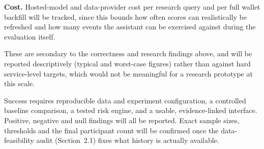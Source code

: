 \textbf{Cost.} Hosted-model and data-provider cost per research query and per full wallet backfill will be tracked, since this bounds how often scores can realistically be refreshed and how many events the assistant can be exercised against during the evaluation itself.

These are secondary to the correctness and research findings above, and will be reported descriptively (typical and worst-case figures) rather than against hard service-level targets, which would not be meaningful for a research prototype at this scale.

Success requires reproducible data and experiment configuration, a controlled baseline comparison, a tested risk engine, and a usable, evidence-linked interface. Positive, negative and null findings will all be reported. Exact sample sizes, thresholds and the final participant count will be confirmed once the data-feasibility audit (Section~2.1) fixes what history is actually available.
